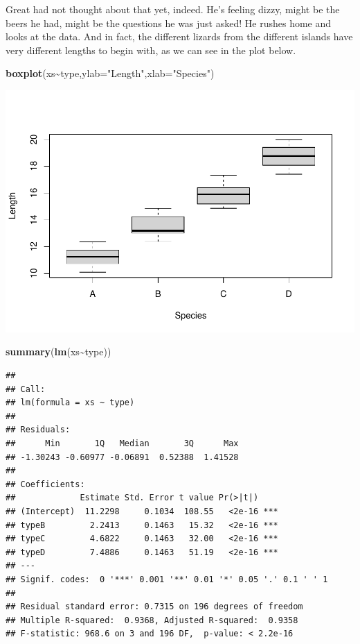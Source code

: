 \documentclass[
]{book}
\newenvironment{Shaded}{\begin{snugshade}}{\end{snugshade}}
\newcommand{\AttributeTok}[1]{\textcolor[rgb]{0.13,0.29,0.53}{#1}}
\newcommand{\FunctionTok}[1]{\textcolor[rgb]{0.13,0.29,0.53}{\textbf{#1}}}
\newcommand{\NormalTok}[1]{#1}
\newcommand{\SpecialCharTok}[1]{\textcolor[rgb]{0.81,0.36,0.00}{\textbf{#1}}}
\newcommand{\StringTok}[1]{\textcolor[rgb]{0.31,0.60,0.02}{#1}}
\begin{document}
Great had not thought about that yet, indeed. He's feeling dizzy, might be the beers he had, might be the questions he was just asked! He rushes home and looks at the data. And in fact, the different lizards from the different islands have very different lengths to begin with, as we can see in the plot below.

\begin{Shaded}
\begin{Highlighting}[]
\FunctionTok{boxplot}\NormalTok{(xs}\SpecialCharTok{\textasciitilde{}}\NormalTok{type,}\AttributeTok{ylab=}\StringTok{"Length"}\NormalTok{,}\AttributeTok{xlab=}\StringTok{"Species"}\NormalTok{)}
\end{Highlighting}
\end{Shaded}

\includegraphics{ECOMODbook_files/figure-latex/a10.6-1.pdf}

\begin{Shaded}
\begin{Highlighting}[]
\FunctionTok{summary}\NormalTok{(}\FunctionTok{lm}\NormalTok{(xs}\SpecialCharTok{\textasciitilde{}}\NormalTok{type))}
\end{Highlighting}
\end{Shaded}

\begin{verbatim}
## 
## Call:
## lm(formula = xs ~ type)
## 
## Residuals:
##      Min       1Q   Median       3Q      Max 
## -1.30243 -0.60977 -0.06891  0.52388  1.41528 
## 
## Coefficients:
##             Estimate Std. Error t value Pr(>|t|)    
## (Intercept)  11.2298     0.1034  108.55   <2e-16 ***
## typeB         2.2413     0.1463   15.32   <2e-16 ***
## typeC         4.6822     0.1463   32.00   <2e-16 ***
## typeD         7.4886     0.1463   51.19   <2e-16 ***
## ---
## Signif. codes:  0 '***' 0.001 '**' 0.01 '*' 0.05 '.' 0.1 ' ' 1
## 
## Residual standard error: 0.7315 on 196 degrees of freedom
## Multiple R-squared:  0.9368, Adjusted R-squared:  0.9358 
## F-statistic: 968.6 on 3 and 196 DF,  p-value: < 2.2e-16
\end{verbatim}
\end{document}
